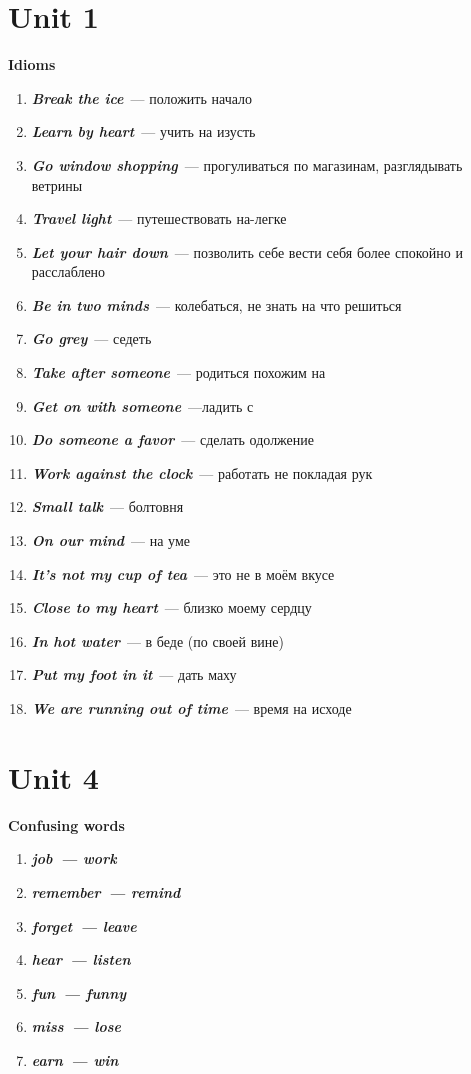 \documentclass[10pt,a4paper]{article}
\begin{document}
\section{Unit 1}
\textbf{Idioms}

\begin{enumerate}
 \item \textit{\textbf{Break the ice}}~--- положить начало 
 \item \textit{\textbf{Learn by heart}}~--- учить на изусть
 \item \textit{\textbf{Go window shopping}}~--- прогуливаться по магазинам, разглядывать ветрины
 \item \textit{\textbf{Travel light}}~--- путешествовать на-легке
 \item \textit{\textbf{Let your hair down}}~--- позволить себе вести себя более спокойно и расслаблено
 \item \textit{\textbf{Be in two minds}}~--- колебаться, не знать на что решиться
 \item \textit{\textbf{Go grey}}~--- седеть
 \item \textit{\textbf{Take after someone}}~--- родиться похожим на
 \item \textit{\textbf{Get on with someone}}~---ладить с 
 \item \textit{\textbf{Do someone a favor}}~--- сделать одолжение
 \item \textit{\textbf{Work against the clock}}~--- работать не покладая рук
 \item \textit{\textbf{Small talk}}~--- болтовня
 \item \textit{\textbf{On our mind}}~--- на уме
 \item \textit{\textbf{It's not my cup of tea}}~--- это не в моём вкусе
 \item \textit{\textbf{Close to my heart}}~--- близко моему сердцу
 \item \textit{\textbf{In hot water}}~--- в беде (по своей вине)
 \item \textit{\textbf{Put my foot in it}}~--- дать маху
 \item \textit{\textbf{We are running out of time}}~--- время на исходе
\end{enumerate}



\section{Unit 4}

\textbf{Confusing words}
\begin{enumerate}
  \item \textit{\textbf{job~--- work}}
  \item \textit{\textbf{remember~--- remind}}
  \item \textit{\textbf{forget~--- leave}}
  \item \textit{\textbf{hear~--- listen}}
  \item \textit{\textbf{fun~--- funny}}
  \item \textit{\textbf{miss~--- lose}}
  \item \textit{\textbf{earn~--- win}}
\end{enumerate}
\end{document}
